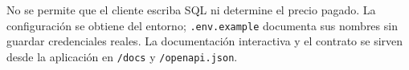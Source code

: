 No se permite que el cliente escriba SQL ni determine el precio pagado. La configuración se obtiene del entorno; \texttt{.env.example} documenta sus nombres sin guardar credenciales reales. La documentación interactiva y el contrato se sirven desde la aplicación en \texttt{/docs} y \texttt{/openapi.json}.
